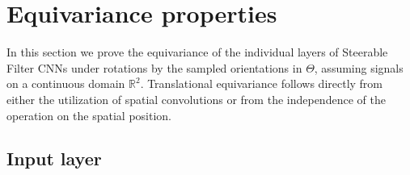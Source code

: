 \documentclass[10pt,twocolumn,letterpaper]{article}
\begin{document}
\section{Equivariance properties}\label{apx:Equivariance}

In this section we prove the equivariance of the individual layers of Steerable Filter CNNs under rotations by the sampled orientations in $\Theta$, assuming signals on a continuous domain $\mathbb{R}^2$.
Translational equivariance follows directly from either the utilization of spatial convolutions or from the independence of the operation on the spatial position.

\subsection{Input layer}
\end{document}
